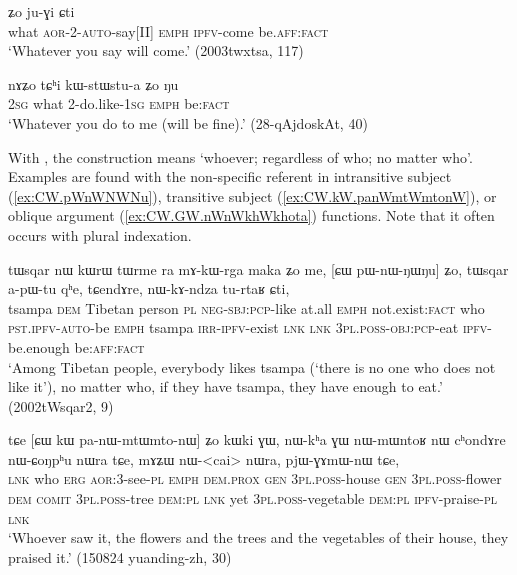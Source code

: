 \begin{exe}
\ex \label{ex:tChi.tAtWnWtWtWt}
 ʑo ju-ɣi ɕti \\
what \textsc{aor}-2-\textsc{auto}-say[II] \textsc{emph} \textsc{ipfv}-come be.\textsc{aff}:\textsc{fact} \\
\glt  `Whatever you say will come.' (2003twxtsa, 117)
\end{exe}  

\begin{exe}
\ex \label{ex:tChi.kWstWstua}
\gll nɤʑo tɕʰi kɯ-stɯ\redp{}stu-a ʑo ŋu \\
\textsc{2sg} what 2-do.like-\textsc{1sg} \textsc{emph} be:\textsc{fact} \\
\glt `Whatever you do to me (will be fine).' (28-qAjdoskAt, 40)
\end{exe}


With , the construction means `whoever; regardless of who; no matter who'. Examples are found with the non-specific referent in intransitive subject (\ref{ex:CW.pWnWNWNu}), transitive subject (\ref{ex:CW.kW.panWmtWmtonW}), or oblique argument (\ref{ex:CW.GW.nWnWkhWkhota}) functions. Note that it often occurs with plural indexation.

\begin{exe}
\ex \label{ex:CW.pWnWNWNu}
\gll tɯsqar nɯ kɯrɯ tɯrme ra mɤ-kɯ-rga maka ʑo me, [ɕɯ pɯ-nɯ-ŋɯ\redp{}ŋu] ʑo, tɯsqar a-pɯ-tu qʰe, tɕendɤre, nɯ-kɤ-ndza tu-rtaʁ ɕti, \\
tsampa \textsc{dem} Tibetan person \textsc{pl} \textsc{neg}-\textsc{sbj}:\textsc{pcp}-like at.all \textsc{emph} not.exist:\textsc{fact} who  \textsc{pst}.\textsc{ipfv}-\textsc{auto}-be \textsc{emph} tsampa \textsc{irr}-\textsc{ipfv}-exist \textsc{lnk} \textsc{lnk} \textsc{3pl}.\textsc{poss}-\textsc{obj}:\textsc{pcp}-eat \textsc{ipfv}-be.enough be:\textsc{aff}:\textsc{fact} \\
\glt `Among Tibetan people, everybody likes tsampa (`there is no one who does not like it'), no matter who, if they have tsampa, they have enough to eat.' (2002tWsqar2, 9)
\end{exe}

\begin{exe}
\ex \label{ex:CW.kW.panWmtWmtonW}
\gll tɕe [ɕɯ kɯ pa-nɯ-mtɯ\redp{}mto-nɯ] ʑo kɯki ɣɯ, nɯ-kʰa ɣɯ nɯ-mɯntoʁ nɯ cʰondɤre nɯ-ɕoŋpʰu nɯra tɕe, mɤʑɯ nɯ-<cai> nɯra, pjɯ-ɣɤmɯ-nɯ tɕe, \\
\textsc{lnk} who \textsc{erg} \textsc{aor}:3\flobv{}-see-\textsc{pl} \textsc{emph} \textsc{dem}.\textsc{prox} \textsc{gen} \textsc{3pl}.\textsc{poss}-house \textsc{gen} \textsc{3pl}.\textsc{poss}-flower \textsc{dem} \textsc{comit} \textsc{3pl}.\textsc{poss}-tree \textsc{dem}:\textsc{pl} \textsc{lnk} yet \textsc{3pl}.\textsc{poss}-vegetable \textsc{dem}:\textsc{pl} \textsc{ipfv}-praise-\textsc{pl} \textsc{lnk} \\
\glt `Whoever saw it, the flowers and the trees and the vegetables of their house, they praised it.' (150824 yuanding-zh, 30)
\end{exe}


